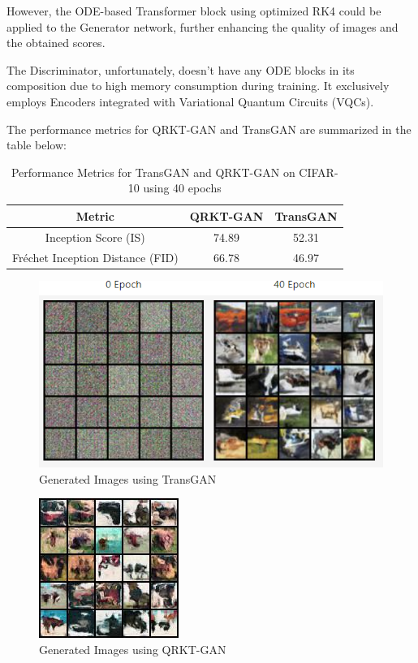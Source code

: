 \documentclass[12pt,a4paper]{report}
\begin{document}
However, the ODE-based Transformer block using optimized RK4 could be applied to the Generator network, further enhancing the quality of images and the obtained scores.

The Discriminator, unfortunately, doesn't have any ODE blocks in its composition due to high memory consumption during training. It exclusively employs Encoders integrated with Variational Quantum Circuits (VQCs).

The performance metrics for QRKT-GAN and TransGAN are summarized in the table below:

\begin{table}[h!]
  \centering
  \begin{tabular}{|c|c|c|}
    \hline
    \textbf{Metric}                  & \textbf{QRKT-GAN} & \textbf{TransGAN} \\
    \hline
    Inception Score (IS)             & 74.89             & 52.31             \\
    \hline
    Fréchet Inception Distance (FID) & 66.78             & 46.97             \\
    \hline
  \end{tabular}
  \caption{Performance Metrics for TransGAN and QRKT-GAN on CIFAR-10 using 40 epochs}
  \label{table:performance_metrics}
\end{table}

\begin{figure}[th]
  \centering
  \includegraphics[scale=0.7]{./pics/gan_gen.png}
  \caption[Generated Images using TransGAN]{Generated Images using TransGAN~\cite{ahmet_sarigun_2024_10806360}}
  \label{fig:p40}
\end{figure}

\begin{figure}[th]
  \centering
  \includegraphics[scale=0.88]{./pics/generated_img_39_1600.jpg}
  \caption[Generated Images using QRKT-GAN]{Generated Images using QRKT-GAN}
  \label{fig:p41}
\end{figure}
\end{document}
